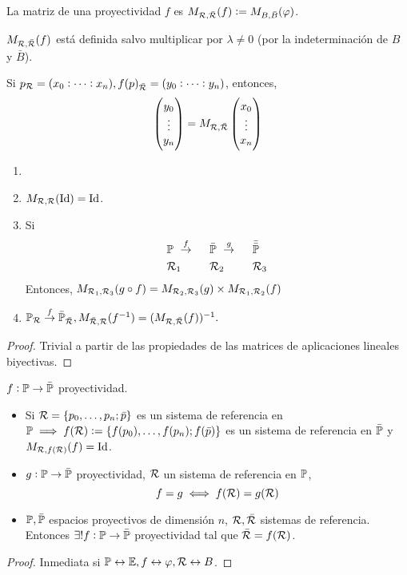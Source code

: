 \begin{defi}
	La matriz de una proyectividad $f$ es $M_{\mathcal{R}, \bar{\mathcal{R}}} (f) := M_{B, \bar{B}}(\varphi)$.
\end{defi}
\begin{obs}
	$M_{\mathcal{R}, \bar{\mathcal{R}}} (f)$ está definida salvo multiplicar por $\lambda \neq 0$ (por la indeterminación de $B$ y $\bar{B}$).
\end{obs}
\begin{obs}
	Si $p_{\mathcal{R}} = (x_0 : \dots : x_n), f(p)_{\bar{\mathcal{R}}} = (y_0 : \dots : y_n)$, entonces,
	\[
	\begin{pmatrix} y_0 \\ \vdots \\ y_n \end{pmatrix} = M_{\mathcal{R}, \bar{\mathcal{R}}} \begin{pmatrix} x_0 \\ \vdots \\ x_n \end{pmatrix}
	\]
\end{obs}
\begin{prop}[Propiedades]
	\begin{enumerate}
		\item[]
		\item $M_{\mathcal{R}, \mathcal{R}}(\operatorname{Id}) = \operatorname{Id}$.
		\item Si
			\begin{alignat*}{3}
				&\mathbb{P} \text{ } \stackrel{f}{\to} \text{  } &&\bar{\mathbb{P}} \text{ } \stackrel{g}{\to} \text{  } &&\bar{\bar{\mathbb{P}}} \\
				&\mathcal{R}_1 &&\mathcal{R}_2 &&\mathcal{R}_3
			\end{alignat*}
			Entonces, $M_{\mathcal{R}_1, \mathcal{R}_3}(g \circ f) = M_{\mathcal{R}_2, \mathcal{R}_3}(g) \times M_{\mathcal{R}_1, \mathcal{R}_2}(f)$
		\item $\mathbb{P}_{\mathcal{R}} \stackrel{f}{\to} \bar{\mathbb{P}}_{\bar{\mathcal{R}}}, M_{\bar{\mathcal{R}}, \mathcal{R}}(f^{-1}) = (M_{\mathcal{R}, \bar{\mathcal{R}}} (f))^{-1}.$
	\end{enumerate}
\end{prop}
\begin{proof}
	Trivial a partir de las propiedades de las matrices de aplicaciones lineales biyectivas.
\end{proof}
\begin{prop}
	$f : \mathbb{P} \to \bar{\mathbb{P}}$ proyectividad.
	\begin{itemize}
		\item Si $\mathcal{R} = \{p_0, \dots, p_n; \bar{p}\}$ es un sistema de referencia en $\mathbb{P} \implies f(\mathcal{R}) := \{f(p_0), \dots, f(p_n); f(\bar{p})\}$ es un sistema de referencia en $\bar{\mathbb{P}}$ y $M_{\mathcal{R}, f(\mathcal{R})}(f) = \operatorname{Id}$.
		\item $g : \mathbb{P} \to \bar{\mathbb{P}}$ proyectividad, $\mathcal{R}$ un sistema de referencia en $\mathbb{P}$,
			\[
				f = g \iff f(\mathcal{R}) = g(\mathcal{R})
			\]
		\item $\mathbb{P}, \bar{\mathbb{P}}$ espacios proyectivos de dimensión $n$, $\mathcal{R}, \bar{\mathcal{R}}$ sistemas de referencia. Entonces $\exists! f : \mathbb{P} \to \bar{\mathbb{P}}$ proyectividad tal que $\bar{\mathcal{R}} = f(\mathcal{R})$.
	\end{itemize}
\end{prop}
\begin{proof}
	Inmediata si $\mathbb{P} \leftrightarrow \mathbb{E}, f \leftrightarrow \varphi, \mathcal{R} \leftrightarrow B$.
\end{proof}


